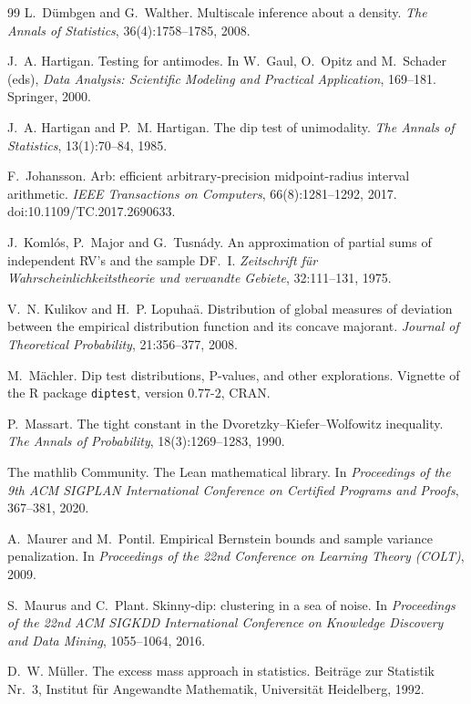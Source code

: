 \begin{thebibliography}{99}
 L.~Dümbgen and G.~Walther. Multiscale inference about a density. \emph{The Annals of Statistics}, 36(4):1758--1785, 2008.

 J.~A. Hartigan. Testing for antimodes. In W.~Gaul, O.~Opitz and M.~Schader (eds), \emph{Data Analysis: Scientific Modeling and Practical Application}, 169--181. Springer, 2000.

 J.~A. Hartigan and P.~M. Hartigan. The dip test of unimodality. \emph{The Annals of Statistics}, 13(1):70--84, 1985.

 F.~Johansson. Arb: efficient arbitrary-precision midpoint-radius interval arithmetic. \emph{IEEE Transactions on Computers}, 66(8):1281--1292, 2017. doi:10.1109/TC.2017.2690633.

 J.~Komlós, P.~Major and G.~Tusnády. An approximation of partial sums of independent RV's and the sample DF.~I. \emph{Zeitschrift für Wahrscheinlichkeitstheorie und verwandte Gebiete}, 32:111--131, 1975.

 V.~N. Kulikov and H.~P. Lopuhaä. Distribution of global measures of deviation between the empirical distribution function and its concave majorant. \emph{Journal of Theoretical Probability}, 21:356--377, 2008.

 M.~Mächler. Dip test distributions, P-values, and other explorations. Vignette of the R package \texttt{diptest}, version 0.77-2, CRAN.

 P.~Massart. The tight constant in the Dvoretzky--Kiefer--Wolfowitz inequality. \emph{The Annals of Probability}, 18(3):1269--1283, 1990.

 The mathlib Community. The Lean mathematical library. In \emph{Proceedings of the 9th ACM SIGPLAN International Conference on Certified Programs and Proofs}, 367--381, 2020.

 A.~Maurer and M.~Pontil. Empirical Bernstein bounds and sample variance penalization. In \emph{Proceedings of the 22nd Conference on Learning Theory (COLT)}, 2009.

 S.~Maurus and C.~Plant. Skinny-dip: clustering in a sea of noise. In \emph{Proceedings of the 22nd ACM SIGKDD International Conference on Knowledge Discovery and Data Mining}, 1055--1064, 2016.

 D.~W. Müller. The excess mass approach in statistics. Beiträge zur Statistik Nr.~3, Institut für Angewandte Mathematik, Universität Heidelberg, 1992.


\end{thebibliography}
